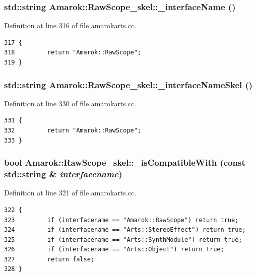 \subsubsection{\setlength{\rightskip}{0pt plus 5cm}std::string Amarok::Raw\-Scope\_\-skel::\_\-interface\-Name ()}\label{classAmarok_1_1RawScope__skel_Amarok_1_1RawScope__skela1}




Definition at line 316 of file amarokarts.cc.



\footnotesize\begin{verbatim}317 {
318         return "Amarok::RawScope";
319 }
\end{verbatim}\normalsize 
{}
\subsubsection{\setlength{\rightskip}{0pt plus 5cm}std::string Amarok::Raw\-Scope\_\-skel::\_\-interface\-Name\-Skel ()\hspace{0.3cm}{\tt  [static]}}\label{classAmarok_1_1RawScope__skel_Amarok_1_1RawScope__skele0}




Definition at line 330 of file amarokarts.cc.



\footnotesize\begin{verbatim}331 {
332         return "Amarok::RawScope";
333 }
\end{verbatim}\normalsize 
{}
\subsubsection{\setlength{\rightskip}{0pt plus 5cm}bool Amarok::Raw\-Scope\_\-skel::\_\-is\-Compatible\-With (const std::string \& {\em interfacename})}\label{classAmarok_1_1RawScope__skel_Amarok_1_1RawScope__skela2}




Definition at line 321 of file amarokarts.cc.



\footnotesize\begin{verbatim}322 {
323         if (interfacename == "Amarok::RawScope") return true;
324         if (interfacename == "Arts::StereoEffect") return true;
325         if (interfacename == "Arts::SynthModule") return true;
326         if (interfacename == "Arts::Object") return true;
327         return false;
328 }
\end{verbatim}\normalsize 
{}
